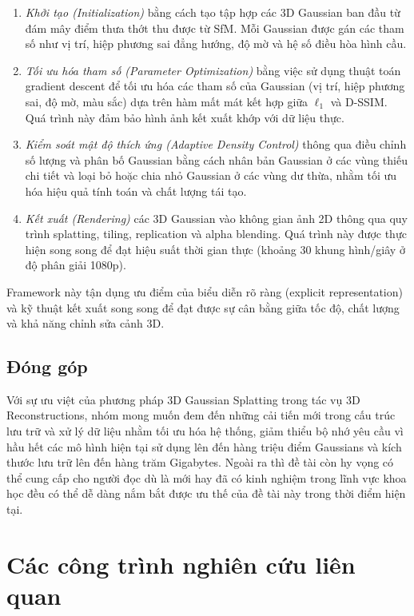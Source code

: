     \begin{enumerate}
        \item \textit{Khởi tạo (Initialization)} bằng cách tạo tập hợp các 3D Gaussian ban đầu từ đám mây điểm thưa thớt thu được từ SfM. Mỗi Gaussian được gán các tham số như vị trí, hiệp phương sai đẳng hướng, độ mờ và hệ số điều hòa hình cầu.
        \item \textit{Tối ưu hóa tham số (Parameter Optimization)} bằng việc sử dụng thuật toán gradient descent để tối ưu hóa các tham số của Gaussian (vị trí, hiệp phương sai, độ mờ, màu sắc) dựa trên hàm mất mát kết hợp giữa $\ell_1$ và D-SSIM. Quá trình này đảm bảo hình ảnh kết xuất khớp với dữ liệu thực.
        \item \textit{Kiểm soát mật độ thích ứng (Adaptive Density Control)} thông qua điều chỉnh số lượng và phân bố Gaussian bằng cách nhân bản Gaussian ở các vùng thiếu chi tiết và loại bỏ hoặc chia nhỏ Gaussian ở các vùng dư thừa, nhằm tối ưu hóa hiệu quả tính toán và chất lượng tái tạo.
        \item \textit{Kết xuất (Rendering)} các 3D Gaussian vào không gian ảnh 2D thông qua quy trình splatting, tiling, replication và alpha blending. Quá trình này được thực hiện song song để đạt hiệu suất thời gian thực (khoảng 30 khung hình/giây ở độ phân giải 1080p). 
    \end{enumerate}
        
    Framework này tận dụng ưu điểm của biểu diễn rõ ràng (explicit representation) và kỹ thuật kết xuất song song để đạt được sự cân bằng giữa tốc độ, chất lượng và khả năng chỉnh sửa cảnh 3D.
    
    \subsection{Đóng góp}
    Với sự ưu việt của phương pháp 3D Gaussian Splatting trong tác vụ 3D Reconstructions, nhóm mong muốn đem đến những cải tiến mới trong cấu trúc lưu trữ và xử lý dữ liệu nhằm tối ưu hóa hệ thống, giảm thiểu bộ nhớ yêu cầu vì hầu hết các mô hình hiện tại sử dụng lên đến hàng triệu điểm Gaussians và kích thước lưu trữ lên đến hàng trăm Gigabytes. Ngoài ra thì đề tài còn hy vọng có thể cung cấp cho người đọc dù là mới hay đã có kinh nghiệm trong lĩnh vực khoa học đều có thể dễ dàng nắm bắt được ưu thế của đề tài này trong thời điểm hiện tại. 

\newpage
\section{Các công trình nghiên cứu liên quan}

